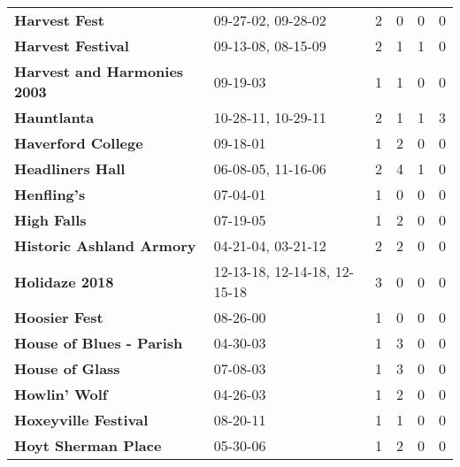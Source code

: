 \begin{supertabular}{llllll}
                                                \textbf{Harvest Fest} &            09-27-02, 09-28-02 &  2 &   0 &  0 &  0 \\
                                            \textbf{Harvest Festival} &            09-13-08, 08-15-09 &  2 &   1 &  1 &  0 \\
                                  \textbf{Harvest and Harmonies 2003} &                      09-19-03 &  1 &   1 &  0 &  0 \\
                                                  \textbf{Hauntlanta} &            10-28-11, 10-29-11 &  2 &   1 &  1 &  3 \\
                                           \textbf{Haverford College} &                      09-18-01 &  1 &   2 &  0 &  0 \\
                                             \textbf{Headliners Hall} &            06-08-05, 11-16-06 &  2 &   4 &  1 &  0 \\
                                                  \textbf{Henfling's} &                      07-04-01 &  1 &   0 &  0 &  0 \\
                                                  \textbf{High Falls} &                      07-19-05 &  1 &   2 &  0 &  0 \\
                                     \textbf{Historic Ashland Armory} &            04-21-04, 03-21-12 &  2 &   2 &  0 &  0 \\
                                               \textbf{Holidaze 2018} &  12-13-18, 12-14-18, 12-15-18 &  3 &   0 &  0 &  0 \\
                                                \textbf{Hoosier Fest} &                      08-26-00 &  1 &   0 &  0 &  0 \\
                                     \textbf{House of Blues - Parish} &                      04-30-03 &  1 &   3 &  0 &  0 \\
                                              \textbf{House of Glass} &                      07-08-03 &  1 &   3 &  0 &  0 \\
                                                \textbf{Howlin' Wolf} &                      04-26-03 &  1 &   2 &  0 &  0 \\
                                         \textbf{Hoxeyville Festival} &                      08-20-11 &  1 &   1 &  0 &  0 \\
                                          \textbf{Hoyt Sherman Place} &                      05-30-06 &  1 &   2 &  0 &  0 \\

\end{supertabular}
